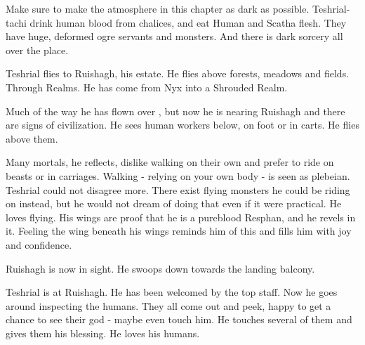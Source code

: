 




Make sure to make the atmosphere in this chapter as dark as possible. 
Teshrial-tachi drink human blood from chalices, and eat Human and Scatha flesh. 
They have huge, deformed ogre servants and monsters. 
And there is dark sorcery all over the place. 









\begin{comment}
\subsection{Flying}
\end{comment}

Teshrial flies to Ruishagh, his estate. 
He flies above forests, meadows and fields. 
Through Realms. 
He has come from Nyx into a Shrouded Realm. 

Much of the way he has flown over \Wylde{}, but now he is nearing Ruishagh and there are signs of civilization. 
He sees human workers below, on foot or in carts. 
He flies above them. 

Many mortals, he reflects, dislike walking on their own and prefer to ride on beasts or in carriages. 
Walking - relying on your own body - is seen as plebeian. 
Teshrial could not disagree more. 
There exist flying monsters he could be riding on instead, but he would not dream of doing that even if it were practical. 
He loves flying. 
His wings are proof that he is a pureblood Resphan, and he revels in it. 
Feeling the wing beneath his wings reminds him of this and fills him with joy and confidence. 


Ruishagh is now in sight. 
He swoops down towards the landing balcony. 










\begin{comment}
\subsection{Blessing}
\end{comment}
\new
Teshrial is at Ruishagh. 
He has been welcomed by the top staff. 
Now he goes around inspecting the humans. 
They all come out and peek, happy to get a chance to see their god - maybe even touch him. 
He touches several of them and gives them his blessing. 
He loves his humans. 

